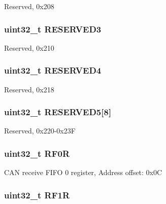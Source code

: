 Reserved, 0x208 \hypertarget{struct_c_a_n___type_def_af2b40c5e36a5e861490988275499e158}{
\subsubsection[{R\-E\-S\-E\-R\-V\-E\-D3}]{\setlength{\rightskip}{0pt plus 5cm}uint32\-\_\-t R\-E\-S\-E\-R\-V\-E\-D3}}\label{struct_c_a_n___type_def_af2b40c5e36a5e861490988275499e158}
Reserved, 0x210 \hypertarget{struct_c_a_n___type_def_ac0018930ee9f18afda25b695b9a4ec16}{
\subsubsection[{R\-E\-S\-E\-R\-V\-E\-D4}]{\setlength{\rightskip}{0pt plus 5cm}uint32\-\_\-t R\-E\-S\-E\-R\-V\-E\-D4}}\label{struct_c_a_n___type_def_ac0018930ee9f18afda25b695b9a4ec16}
Reserved, 0x218 \hypertarget{struct_c_a_n___type_def_a269f31b91d0f38a48061b76ecc346f55}{
\subsubsection[{R\-E\-S\-E\-R\-V\-E\-D5}]{\setlength{\rightskip}{0pt plus 5cm}uint32\-\_\-t R\-E\-S\-E\-R\-V\-E\-D5\mbox{[}8\mbox{]}}}\label{struct_c_a_n___type_def_a269f31b91d0f38a48061b76ecc346f55}
Reserved, 0x220-\/0x23\-F \hypertarget{struct_c_a_n___type_def_accf4141cee239380d0ad4634ee21dbf6}{
\subsubsection[{R\-F0\-R}]{ uint32\-\_\-t R\-F0\-R}}\label{struct_c_a_n___type_def_accf4141cee239380d0ad4634ee21dbf6}
C\-A\-N receive F\-I\-F\-O 0 register, Address offset\-: 0x0\-C \hypertarget{struct_c_a_n___type_def_a02b589bb589df4f39e549dca4d5abb08}{
\subsubsection[{R\-F1\-R}]{ uint32\-\_\-t R\-F1\-R}}\label{struct_c_a_n___type_def_a02b589bb589df4f39e549dca4d5abb08}
